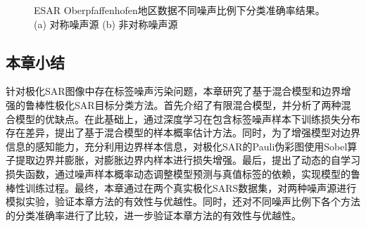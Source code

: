 \begin{figure}[ht!]
    \caption{ESAR Oberpfaffenhofen地区数据不同噪声比例下分类准确率结果。(a) 对称噪声源 (b) 非对称噪声源}
    \label{fig:ober_noise}
\end{figure}

\subsection{本章小结}
针对极化SAR图像中存在标签噪声污染问题，本章研究了基于混合模型和边界增强的鲁棒性极化SAR目标分类方法。首先介绍了有限混合模型，并分析了两种混合模型的优缺点。在此基础上，通过深度学习在包含标签噪声样本下训练损失分布存在差异，提出了基于混合模型的样本概率估计方法。同时，为了增强模型对边界信息的感知能力，充分利用边界样本信息，对极化SAR的Pauli伪彩图使用Sobel算子提取边界并膨胀，对膨胀边界内样本进行损失增强。最后，提出了动态的自学习损失函数，通过噪声样本概率动态调整模型预测与真值标签的依赖，实现模型的鲁棒性训练过程。最终，本章通过在两个真实极化SARS数据集，对两种噪声源进行模拟实验，验证本章方法的有效性与优越性。同时，还对不同噪声比例下各个方法的分类准确率进行了比较，进一步验证本章方法的有效性与优越性。